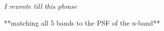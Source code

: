 \documentclass[numberedappendix,apj,twocolumn]{emulateapj}
\begin{document}

\textit{I rewrote till this phrase}

**matching all 5 bands to the PSF of the u-band**
\end{document}
